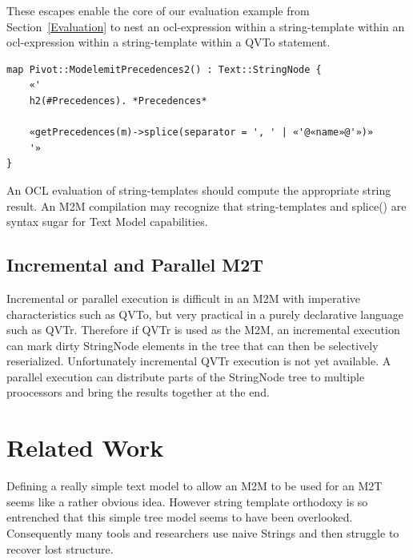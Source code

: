 \documentclass{llncs}
\begin{document}
These escapes enable the core of our evaluation example from Section~\ref{Evaluation} to nest an ocl-expression within a string-template within an ocl-expression within a string-template within a QVTo statement.

\begin{verbatim}
map Pivot::ModelemitPrecedences2() : Text::StringNode {
    «'
    h2(#Precedences). *Precedences*
	
    «getPrecedences(m)->splice(separator = ', ' | «'@«name»@'»)»
    '»
}
\end{verbatim}

An OCL evaluation of string-templates should compute the appropriate string result. An M2M compilation may recognize that string-templates and splice() are syntax sugar for Text Model capabilities.



\subsection{Incremental and Parallel M2T}\label{Incremental M2T}

Incremental or parallel execution is difficult in an M2M with imperative characteristics such as QVTo, but very practical in a purely declarative language such as QVTr. Therefore if QVTr is used as the M2M, an incremental execution can mark dirty StringNode elements in the tree that can then be selectively reserialized. Unfortunately incremental QVTr execution is not yet available. A parallel execution can distribute parts of the StringNode tree to multiple proocessors and bring the results together at the end.

\section{Related Work}\label{Related Work}

Defining a really simple text model to allow an M2M to be used for an M2T seems like a rather obvious idea. However string template orthodoxy is so entrenched that this simple tree model seems to have been overlooked. Consequently many tools and researchers use naive Strings and then struggle to recover lost structure.
\end{document}
